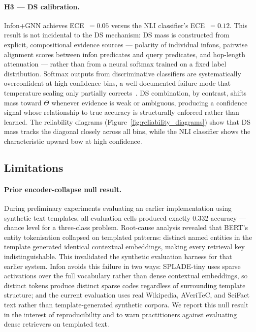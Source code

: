 \paragraph{H3 — DS calibration.}
Infon+GNN achieves ECE~$= 0.05$ versus the NLI classifier's ECE~$=
0.12$.  This result is not incidental to the DS mechanism: DS mass is
constructed from explicit, compositional evidence sources — polarity of
individual infons, pairwise alignment scores between infon predicates and
query predicates, and hop-length attenuation — rather than from a neural
softmax trained on a fixed label distribution.  Softmax outputs from
discriminative classifiers are systematically overconfident at high
confidence bins, a well-documented failure mode that temperature scaling only
partially corrects~\cite{guo2017calibration}.  DS combination, by contrast,
shifts mass toward $\Theta$ whenever evidence is weak or ambiguous,
producing a confidence signal whose relationship to true accuracy is
structurally enforced rather than learned.  The reliability diagrams
(Figure~\ref{fig:reliability_diagrams}) show that DS mass tracks the
diagonal closely across all bins, while the NLI classifier shows the
characteristic upward bow at high confidence.

\subsection{Limitations}
\label{sec:discussion:limitations}

\paragraph{Prior encoder-collapse null result.}
During preliminary experiments evaluating an earlier implementation using
synthetic text templates, all evaluation cells produced exactly 0.332
accuracy --- chance level for a three-class problem.  Root-cause analysis
revealed that BERT's entity tokenisation collapsed on templated patterns:
distinct named entities in the template generated identical contextual
embeddings, making every retrieval key indistinguishable.  This invalidated
the synthetic evaluation harness for that earlier system.  Infon avoids this
failure in two ways: SPLADE-tiny uses sparse activations over the full
vocabulary rather than dense contextual embeddings, so distinct tokens
produce distinct sparse codes regardless of surrounding template structure;
and the current evaluation uses real Wikipedia, AVeriTeC, and SciFact text
rather than template-generated synthetic corpora.  We report this null result
in the interest of reproducibility and to warn practitioners against
evaluating dense retrievers on templated text.


